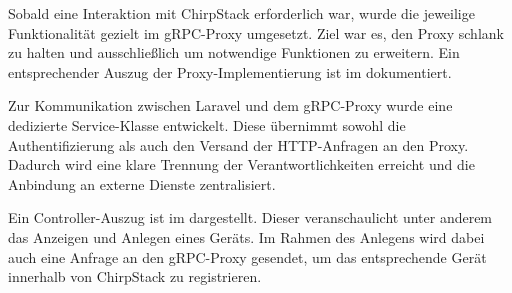 	Sobald eine Interaktion mit ChirpStack erforderlich war, wurde die jeweilige Funktionalität gezielt im gRPC-Proxy umgesetzt.
	Ziel war es, den Proxy schlank zu halten und ausschließlich um notwendige Funktionen zu erweitern.
	Ein entsprechender Auszug der Proxy-Implementierung ist im  dokumentiert.

	Zur Kommunikation zwischen Laravel und dem gRPC-Proxy wurde eine dedizierte Service-Klasse entwickelt.
	Diese übernimmt sowohl die Authentifizierung als auch den Versand der HTTP-Anfragen an den Proxy.
	Dadurch wird eine klare Trennung der Verantwortlichkeiten erreicht und die Anbindung an externe Dienste zentralisiert.

	Ein Controller-Auszug ist im  dargestellt.
	Dieser veranschaulicht unter anderem das Anzeigen und Anlegen eines Geräts.
	Im Rahmen des Anlegens wird dabei auch eine Anfrage an den gRPC-Proxy gesendet,
	um das entsprechende Gerät innerhalb von ChirpStack zu registrieren.


